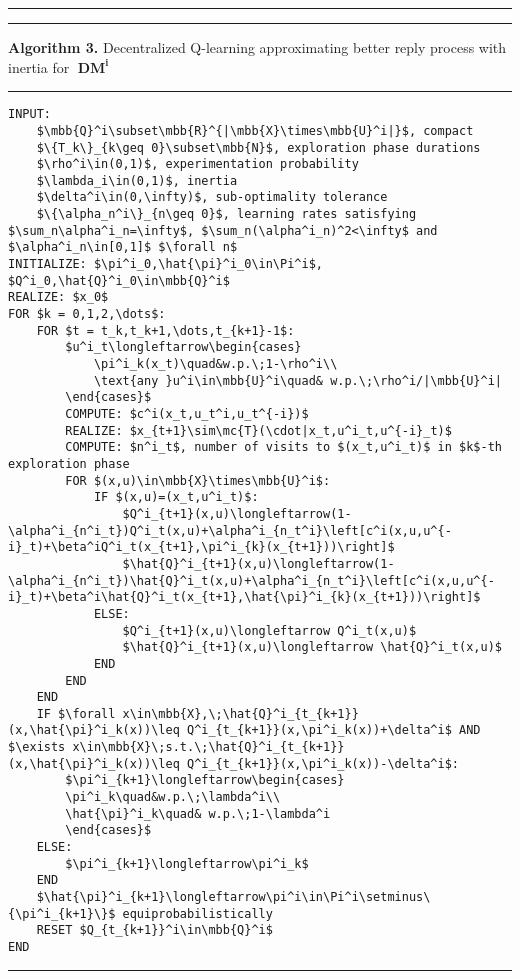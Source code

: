 \documentclass[10pt]{article}
\newcommand{\mbb}[1]{\mathbb{#1}}
\newcommand{\1}[1]{\mathbbm{1}_{#1}}
\newcommand{\mc}[1]{\mathcal{#1}}
\DeclareMathOperator{\DM}{DM}
\begin{document}
\hrule
\newpage
\hrule
{\bf Algorithm 3.} Decentralized Q-learning approximating better reply process with inertia for $\mathbf{\DM^i}$
\hrule
\begin{lstlisting}[mathescape]
INPUT:
    $\mbb{Q}^i\subset\mbb{R}^{|\mbb{X}\times\mbb{U}^i|}$, compact
    $\{T_k\}_{k\geq 0}\subset\mbb{N}$, exploration phase durations
    $\rho^i\in(0,1)$, experimentation probability
    $\lambda_i\in(0,1)$, inertia
    $\delta^i\in(0,\infty)$, sub-optimality tolerance
    $\{\alpha_n^i\}_{n\geq 0}$, learning rates satisfying $\sum_n\alpha^i_n=\infty$, $\sum_n(\alpha^i_n)^2<\infty$ and $\alpha^i_n\in[0,1]$ $\forall n$
INITIALIZE: $\pi^i_0,\hat{\pi}^i_0\in\Pi^i$, $Q^i_0,\hat{Q}^i_0\in\mbb{Q}^i$
REALIZE: $x_0$
FOR $k = 0,1,2,\dots$:
    FOR $t = t_k,t_k+1,\dots,t_{k+1}-1$:
        $u^i_t\longleftarrow\begin{cases}
            \pi^i_k(x_t)\quad&w.p.\;1-\rho^i\\
            \text{any }u^i\in\mbb{U}^i\quad& w.p.\;\rho^i/|\mbb{U}^i|
        \end{cases}$
        COMPUTE: $c^i(x_t,u_t^i,u_t^{-i})$
        REALIZE: $x_{t+1}\sim\mc{T}(\cdot|x_t,u^i_t,u^{-i}_t)$
        COMPUTE: $n^i_t$, number of visits to $(x_t,u^i_t)$ in $k$-th exploration phase 
        FOR $(x,u)\in\mbb{X}\times\mbb{U}^i$:
            IF $(x,u)=(x_t,u^i_t)$:
                $Q^i_{t+1}(x,u)\longleftarrow(1-\alpha^i_{n^i_t})Q^i_t(x,u)+\alpha^i_{n_t^i}\left[c^i(x,u,u^{-i}_t)+\beta^iQ^i_t(x_{t+1},\pi^i_{k}(x_{t+1}))\right]$
                $\hat{Q}^i_{t+1}(x,u)\longleftarrow(1-\alpha^i_{n^i_t})\hat{Q}^i_t(x,u)+\alpha^i_{n_t^i}\left[c^i(x,u,u^{-i}_t)+\beta^i\hat{Q}^i_t(x_{t+1},\hat{\pi}^i_{k}(x_{t+1}))\right]$
            ELSE:
                $Q^i_{t+1}(x,u)\longleftarrow Q^i_t(x,u)$
                $\hat{Q}^i_{t+1}(x,u)\longleftarrow \hat{Q}^i_t(x,u)$
            END
        END
    END
    IF $\forall x\in\mbb{X},\;\hat{Q}^i_{t_{k+1}}(x,\hat{\pi}^i_k(x))\leq Q^i_{t_{k+1}}(x,\pi^i_k(x))+\delta^i$ AND $\exists x\in\mbb{X}\;s.t.\;\hat{Q}^i_{t_{k+1}}(x,\hat{\pi}^i_k(x))\leq Q^i_{t_{k+1}}(x,\pi^i_k(x))-\delta^i$:
        $\pi^i_{k+1}\longleftarrow\begin{cases}
        \pi^i_k\quad&w.p.\;\lambda^i\\
        \hat{\pi}^i_k\quad& w.p.\;1-\lambda^i
        \end{cases}$
    ELSE:
        $\pi^i_{k+1}\longleftarrow\pi^i_k$
    END
    $\hat{\pi}^i_{k+1}\longleftarrow\pi^i\in\Pi^i\setminus\{\pi^i_{k+1}\}$ equiprobabilistically
    RESET $Q_{t_{k+1}}^i\in\mbb{Q}^i$ 
END
\end{lstlisting}
\hrule
\newpage
{}
\end{document}

